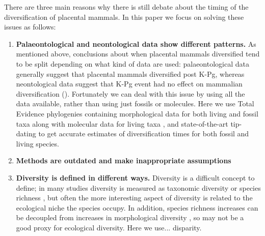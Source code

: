\documentclass[12pt,letterpaper]{article}
\begin{document}
There are three main reasons why there is still debate about the timing of the diversification of placental mammals. In this paper we focus on solving these issues as follows: %
  \begin{enumerate}
    \item \textbf{Palaeontological and neontological data show different patterns.}
    As mentioned above, conclusions about when placental mammals diversified tend to be split depending on what kind of data are used: palaeontological data generally suggest that placental mammals diversified post K-Pg, whereas neontological data suggest that K-Pg event had no effect on mammalian diversification (). 
    Fortunately we can deal with this issue by using all the data available, rather than using just fossils or molecules. 
    Here we use Total Evidence phylogenies containing morphological data for both living and fossil taxa along with molecular data for living taxa \citep{eernissetaxonomic1993,ronquista2012}, and state-of-the-art tip-dating \citep{ronquista2012,Wood01032013} to get accurate estimates of diversification times for both fossil and living species.
    \item \textbf{Methods are outdated and make inappropriate assumptions} %
    \item \textbf{Diversity is defined in different ways.}
    Diversity is a difficult concept to define; in many studies diversity is measured as taxonomic diversity or species richness \citep{Stadler12042011,meredithimpacts2011,O'Leary08022013}, but often the more interesting aspect of diversity is related to the ecological niche the species occupy. 
    In addition, species richness increases can be decoupled from increases in morphological diversity \citep{slaterCetacean,ruta2013,hopkinsdecoupling2013}, so may not be a good proxy for ecological diversity. 
    Here we use... disparity. 
  \end{enumerate}
\end{document}
